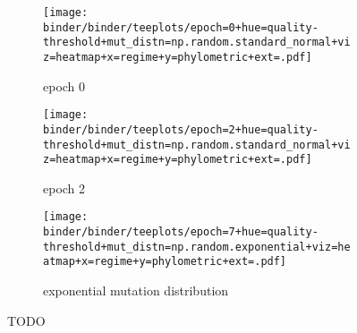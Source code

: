 \begin{figure*}
  \centering
  \begin{subfigure}[b]{\textwidth}
    \centering
    \texttt{[image: binder/binder/teeplots/epoch=0+hue=quality-threshold+mut\_distn=np.random.standard\_normal+viz=heatmap+x=regime+y=phylometric+ext=.pdf]}
    \caption{epoch 0}
    \label{fig:reconstructed-tree-phylometrics-error-sensitivity-analysis:epoch0}
  \end{subfigure}
  \begin{subfigure}[b]{\textwidth}
    \centering
    \texttt{[image: binder/binder/teeplots/epoch=2+hue=quality-threshold+mut\_distn=np.random.standard\_normal+viz=heatmap+x=regime+y=phylometric+ext=.pdf]}
    \caption{epoch 2}
    \label{fig:reconstructed-tree-phylometrics-error-sensitivity-analysis:epoch2}
  \end{subfigure}
  \begin{subfigure}[b]{\textwidth}
    \centering
    \texttt{[image: binder/binder/teeplots/epoch=7+hue=quality-threshold+mut\_distn=np.random.exponential+viz=heatmap+x=regime+y=phylometric+ext=.pdf]}
    \caption{exponential mutation distribution}
    \label{fig:reconstructed-tree-phylometrics-error-sensitivity-analysis:exponential}
  \end{subfigure}
  \caption{TODO}
  \label{fig:reconstructed-tree-phylometrics-error-sensitivity-analysis}
\end{figure*}
